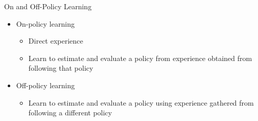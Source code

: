 \begin{frame}[c]{On and Off-Policy Learning}
	
	\begin{itemize}
		\item On-policy learning
		\begin{itemize}
			\item Direct experience
			\item Learn to estimate and evaluate a policy from experience obtained from following \alert{that} policy
		\end{itemize}
		\pause
		\medskip
		\item Off-policy learning
		\begin{itemize}
			\item Learn to estimate and evaluate a policy using experience gathered from following a \alert{different} policy
		\end{itemize}
	\end{itemize}
	
\end{frame}

